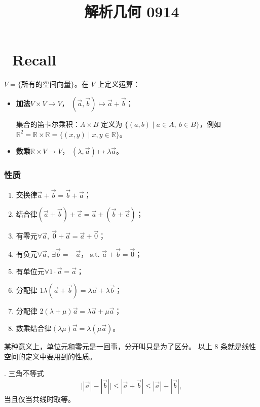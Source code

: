 \documentclass[UTF8,11pt]{ctexart}
\title{解析几何 0914}
\date{}
\theoremstyle{cnthm}
\begin{document}
\maketitle

\section{\ Recall}

$V=\{$所有的空间向量$\}$。在 $V$ 上定义运算：

\begin{itemize}
\item \textbf{加法}\quad $V\times V\longrightarrow V$，
$(\vec a,\vec b)\longmapsto\vec a+\vec b$；

集合的笛卡尔乘积：$A\times B$ 定义为
$\{(a,b)\mid a\in A,\ b\in B\}$，例如
$\mathbb R^2=\mathbb R\times\mathbb R
=\{(x,y)\mid x,y\in\mathbb R\}$。

\item \textbf{数乘}\quad $\mathbb R\times V\longrightarrow V$，
$(\lambda,\vec a)\longmapsto\lambda\vec a$。
\end{itemize}

\subsubsection*{性质}

\begin{enumerate}
\item 交换律\quad $\vec a+\vec b=\vec b+\vec a$；
\item 结合律\quad $(\vec a+\vec b)+\vec c=\vec a+(\vec b+\vec c)$；
\item 有零元\quad $\forall\vec a,\ \vec 0+\vec a=\vec a+\vec 0$；
\item 有负元\quad $\forall\vec a,\ \exists\vec b=-\vec a$，
s.t. $\vec a+\vec b=\vec 0$；
\item 有单位元\quad $\forall 1\cdot\vec a=\vec a$；
\item 分配律 1\quad $\lambda(\vec a+\vec b)
=\lambda\vec a+\lambda\vec b$；
\item 分配律 2\quad $(\lambda+\mu)\vec a
=\lambda\vec a+\mu\vec a$；
\item 数乘结合律\quad $(\lambda\mu)\vec a
=\lambda(\mu\vec a)$。
\end{enumerate}

某种意义上，单位元和零元是一回事，分开叫只是为了区分。
以上 8 条就是线性空间的定义中要用到的性质。

. 三角不等式
\[
\bigl||\vec a|-|\vec b|\bigr|
\leq|\vec a+\vec b|
\leq|\vec a|+|\vec b|,
\]
当且仅当共线时取等。
\end{document}
